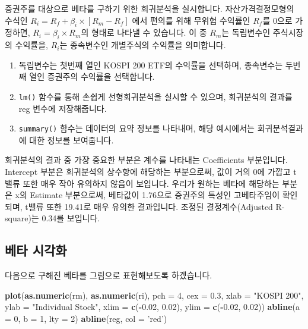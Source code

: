 \documentclass[12pt,]{book}
\newenvironment{Shaded}{\begin{snugshade}}{\end{snugshade}}
\newcommand{\DataTypeTok}[1]{\textcolor[rgb]{0.13,0.29,0.53}{#1}}
\newcommand{\DecValTok}[1]{\textcolor[rgb]{0.00,0.00,0.81}{#1}}
\newcommand{\FloatTok}[1]{\textcolor[rgb]{0.00,0.00,0.81}{#1}}
\newcommand{\KeywordTok}[1]{\textcolor[rgb]{0.13,0.29,0.53}{\textbf{#1}}}
\newcommand{\NormalTok}[1]{#1}
\newcommand{\OperatorTok}[1]{\textcolor[rgb]{0.81,0.36,0.00}{\textbf{#1}}}
\newcommand{\StringTok}[1]{\textcolor[rgb]{0.31,0.60,0.02}{#1}}
\providecommand{\tightlist}{%
  \setlength{\itemsep}{0pt}\setlength{\parskip}{0pt}}
\begin{document}
증권주를 대상으로 베타를 구하기 위한 회귀분석을 실시합니다. 자산가격결정모형의 수식인 \(R_i = R_f + \beta_i \times [R_m - R_f]\) 에서 편의를 위해 무위험 수익률인 \(R_f\)를 0으로 가정하면, \(R_i = \beta_i \times R_m\)의 형태로 나타낼 수 있습니다. 이 중 \(R_m\)는 독립변수인 주식시장의 수익률을, \(R_i\)는 종속변수인 개별주식의 수익률을 의미합니다.

\begin{enumerate}
\def\labelenumi{\arabic{enumi}.}
\tightlist
\item
  독립변수는 첫번째 열인 KOSPI 200 ETF의 수익률을 선택하며, 종속변수는 두번째 열인 증권주의 수익률을 선택합니다.
\item
  \texttt{lm()} 함수를 통해 손쉽게 선형회귀분석을 실시할 수 있으며, 회귀분석의 결과를 reg 변수에 저장해줍니다.
\item
  \texttt{summary()} 함수는 데이터의 요약 정보를 나타내며, 해당 예시에서는 회귀분석결과에 대한 정보를 보여줍니다.
\end{enumerate}

회귀분석의 결과 중 가장 중요한 부분은 계수를 나타내는 Coefficients 부분입니다. Intercept 부분은 회귀분석의 상수항에 해당하는 부분으로써, 값이 거의 0에 가깝고 t밸류 또한 매우 작아 유의하지 않음이 보입니다. 우리가 원하는 베타에 해당하는 부분은 x의 Estimate 부분으로써, 베타값이 1.76으로 증권주의 특성인 고베타주임이 확인되며, t밸류 또한 19.41로 매우 유의한 결과입니다. 조정된 결정계수(Adjusted R-square)는 0.34를 보입니다.

\hypertarget{section-48}{%
\subsection{베타 시각화}\label{section-48}}

다음으로 구해진 베타를 그림으로 표현해보도록 하겠습니다.

\begin{Shaded}
\begin{Highlighting}[]
\KeywordTok{plot}\NormalTok{(}\KeywordTok{as.numeric}\NormalTok{(rm), }\KeywordTok{as.numeric}\NormalTok{(ri), }\DataTypeTok{pch =} \DecValTok{4}\NormalTok{, }\DataTypeTok{cex =} \FloatTok{0.3}\NormalTok{, }
     \DataTypeTok{xlab =} \StringTok{"KOSPI 200"}\NormalTok{, }\DataTypeTok{ylab =} \StringTok{"Individual Stock"}\NormalTok{,}
     \DataTypeTok{xlim =} \KeywordTok{c}\NormalTok{(}\OperatorTok{-}\FloatTok{0.02}\NormalTok{, }\FloatTok{0.02}\NormalTok{), }\DataTypeTok{ylim =} \KeywordTok{c}\NormalTok{(}\OperatorTok{-}\FloatTok{0.02}\NormalTok{, }\FloatTok{0.02}\NormalTok{))}
\KeywordTok{abline}\NormalTok{(}\DataTypeTok{a =} \DecValTok{0}\NormalTok{, }\DataTypeTok{b =} \DecValTok{1}\NormalTok{, }\DataTypeTok{lty =} \DecValTok{2}\NormalTok{)}
\KeywordTok{abline}\NormalTok{(reg, }\DataTypeTok{col =} \StringTok{'red'}\NormalTok{)}
\end{Highlighting}
\end{Shaded}
\end{document}
